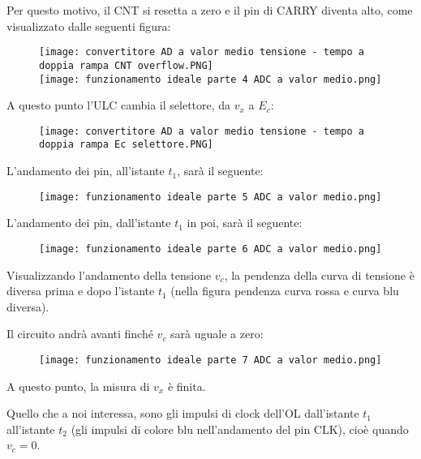 Per questo motivo, il CNT si resetta a zero e il pin di CARRY diventa alto, 
come visualizzato dalle seguenti figura: 

\begin{figure}[h]
    \centering
    \texttt{[image: convertitore AD a valor medio tensione - tempo a doppia rampa CNT overflow.PNG]}
    \\
    \texttt{[image: funzionamento ideale parte 4 ADC a valor medio.png]}
\end{figure}

A questo punto l'ULC cambia il selettore, da $v_x$ a $E_c$: 

\begin{figure}[h]
    \centering
    \texttt{[image: convertitore AD a valor medio tensione - tempo a doppia rampa Ec selettore.PNG]}
\end{figure}

\newpage 

L'andamento dei pin, all'istante $t_1$, sarà il seguente: 

\begin{figure}[h]
    \centering
    \texttt{[image: funzionamento ideale parte 5 ADC a valor medio.png]}
\end{figure}

L'andamento dei pin, dall'istante $t_1$ in poi, sarà il seguente: 

\begin{figure}[h]
    \centering
    \texttt{[image: funzionamento ideale parte 6 ADC a valor medio.png]}
\end{figure}

Visualizzando l'andamento della tensione $v_c$, la pendenza della curva di tensione è diversa prima e dopo l'istante $t_1$ 
(nella figura pendenza curva rossa e curva blu diversa). \newline 

\newpage 

Il circuito andrà avanti finché $v_c$ sarà uguale a zero: 

\begin{figure}[h]
    \centering
    \texttt{[image: funzionamento ideale parte 7 ADC a valor medio.png]}
\end{figure}

A questo punto, la misura di $v_x$ è finita. \newline 

Quello che a noi interessa, sono gli impulsi di clock dell'OL dall'istante $t_1$ all'istante $t_2$ (gli impulsi di colore blu nell'andamento del pin CLK), 
cioè quando $v_c = 0$. \newline 

